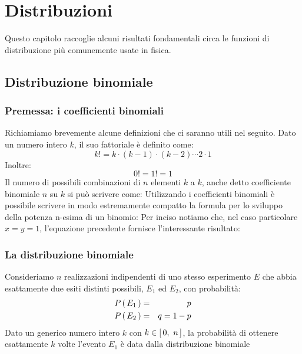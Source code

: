 \chapter{Distribuzioni}
\label{chap:Distribuzioni}
\mt

Questo capitolo raccoglie alcuni risultati fondamentali circa le
funzioni di distribuzione pi\`u comunemente usate in fisica.


\section{Distribuzione binomiale}

\subsection{Premessa: i coefficienti binomiali}

Richiamiamo brevemente alcune definizioni che ci saranno utili nel
seguito. Dato un numero intero $k$, il suo fattoriale \`e definito come:
$$
k! = k \cdot (k - 1) \cdot (k - 2) \cdots 2 \cdot 1
$$
Inoltre:
$$
0!=1!=1
$$
Il numero di possibili combinazioni di $n$ elementi $k$ a $k$,
anche detto coefficiente binomiale $n$ su $k$ si pu\`o scrivere come:
Utilizzando i coefficienti binomiali \`e possibile scrivere in modo
estremamente compatto la formula per lo sviluppo della potenza
n-esima di un binomio:
Per inciso notiamo che, nel caso particolare $x = y = 1$, l'equazione
precedente fornisce l'interessante risultato:


\subsection{La distribuzione binomiale}

Consideriamo $n$ realizzazioni indipendenti di uno stesso
esperimento $E$ che abbia esattamente due esiti distinti possibili,
$E_1$ ed $E_2$, con probabilit\`a:
\begin{eqnarray*}
\displaystyle P\left(\, E_1 \, \right) & = & p\\
\displaystyle P\left(\, E_2 \, \right) & = & q = 1 - p
\end{eqnarray*}
Dato un generico numero intero $k$ con $k \in \left[ \, 0, ~ n \, \right]$, la
probabilit\`a di ottenere esattamente $k$ volte l'evento $E_1$
\`e data dalla distribuzione binomiale

